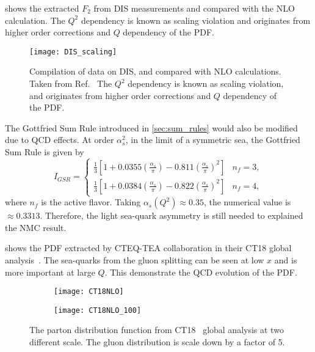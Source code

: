 \documentclass[../main.tex]{subfiles}
\begin{document}
 shows the extracted $F_2$ from DIS measurements and compared
with the NLO calculation. The $Q^2$ dependency is known as scaling violation and
originates from higher order corrections and $Q$ dependency of the PDF.
\begin{figure}[h!]
	\centering
	\texttt{[image: DIS\_scaling]}
	\caption{
		Compilation of data on DIS, and compared with NLO calculations.
		Taken from Ref.~\cite{adloff2003}
		The $Q^2$ dependency is known as scaling violation,
		and originates from higher order corrections and $Q$ dependency of the PDF.
	}
	\label{fig:DIS_scaling}
\end{figure}
The Gottfried Sum Rule introduced in \cref{sec:sum_rules} would also be modified due to
QCD effects. At order $\alpha_s^2$, in the limit of a symmetric sea, the Gottfried Sum Rule
is given by~\cite{kataev2003}
\begin{equation}
	I_{GSR} = \begin{cases}
		\frac{1}{3}\left[ 1 + 0.0355\left(\frac{\alpha_s}{\pi}\right)-0.811\left(\frac{\alpha_s}{\pi}\right)^2 \right] & n_f=3, \\
		\frac{1}{3}\left[ 1 + 0.0384\left(\frac{\alpha_s}{\pi}\right)-0.822\left(\frac{\alpha_s}{\pi}\right)^2 \right] & n_f=4,
	\end{cases}
\end{equation}
where $n_f$ is the active flavor.
Taking $\alpha_s(Q^2)\approx 0.35$, the numerical value is $\approx 0.3313$. Therefore,
the light sea-quark asymmetry is still needed to explained the NMC result.

 shows the PDF extracted by CTEQ-TEA collaboration in their
CT18 global analysis~\cite{hou2021}. The sea-quarks from the gluon splitting
can be seen at low $x$ and is more important at large $Q$. This demonstrate the
QCD evolution of the PDF.

\begin{figure}
	\centering
	\begin{subfigure}{0.45\linewidth}
		\texttt{[image: CT18NLO]}
	\end{subfigure}
	\begin{subfigure}{0.45\linewidth}
		\texttt{[image: CT18NLO\_100]}
	\end{subfigure}
	\caption{The parton distribution function from CT18~\cite{hou2021} global analysis at two different scale.
		The gluon distribution is scale down by a factor of 5.}
	\label{fig:CT18_scale}
\end{figure}
\end{document}
